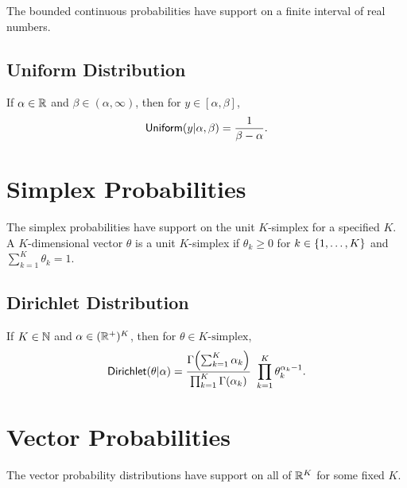 The bounded continuous probabilities have support on a finite interval
of real numbers.

\subsection{Uniform Distribution}

If $\alpha \in \mathbb{R}$ and $\beta \in (\alpha,\infty)$, then for $y
\in [\alpha,\beta]$,
\[
\mbox{\sf Uniform}(y|\alpha,\beta)
= 
\frac{1}{\beta - \alpha}
.
\]

\begin{description}
\end{description}

\section{Simplex Probabilities}

The simplex probabilities have support on the unit $K$-simplex for a
specified $K$.  A $K$-dimensional vector $\theta$ is a unit
$K$-simplex if $\theta_k \geq 0$ for $k \in \{ 1,\ldots,K \}$ and
$\sum_{k = 1}^K \theta_k = 1$.

\subsection{Dirichlet Distribution}

If $K \in \mathbb{N}$ and $\alpha \in (\mathbb{R}^+)^{K}$, then for
$\theta \in \mbox{$K$-simplex}$, 
\[
\mbox{\sf Dirichlet}(\theta|\alpha)
= 
\frac{\Gamma \! \left( \sum_{k=1}^K \alpha_k \right)}
     {\prod_{k=1}^K \Gamma(\alpha_k)}
\
\prod_{k=1}^K \theta_k^{\alpha_k - 1}
.
\]

\begin{description}
%
%
\end{description}


\section{Vector Probabilities}

The vector probability distributions have support on all of
$\mathbb{R}^K$ for some fixed $K$.

